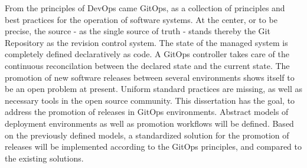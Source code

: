 
\noindent
From the principles of DevOps came GitOps,
as a collection of principles and best practices
for the operation of software systems. At the center,
or to be precise, the source - as the single source of truth -
stands thereby the Git Repository as the revision control system.
The state of the managed system is
completely defined declaratively as code. A GitOps controller
takes care of the continuous reconcilation between the
declared state and the current state.
The promotion of new software releases between several environments
shows itself to be an open problem at present.
Uniform standard practices are missing, as well as necessary tools in the open source community.
This dissertation has the goal,
to address the promotion of releases in GitOps environments.
Abstract models of deployment environments as well as promotion workflows
will be defined.
Based on the previously defined models,
a standardized solution for the promotion of releases
will be implemented according to the GitOps principles,
and compared to the existing solutions.



